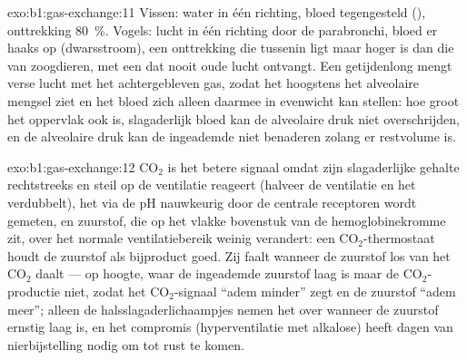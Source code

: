 \begin{solution}{exo:b1:gas-exchange:11}
Vissen: water in één richting, bloed tegengesteld (),
onttrekking \qty{80}{\%}. Vogels: lucht in één richting door de
parabronchi, bloed er haaks op (dwarsstroom), een onttrekking die
tussenin ligt maar hoger is dan die van zoogdieren, met een
 dat nooit oude lucht ontvangt. Een getijdenlong
mengt verse lucht met het achtergebleven gas, zodat het
 hoogstens het alveolaire mengsel ziet en het bloed
zich alleen daarmee in evenwicht kan stellen: hoe groot het oppervlak ook
is, slagaderlijk bloed kan de alveolaire druk niet overschrijden, en de
alveolaire druk kan de ingeademde niet benaderen zolang er restvolume is.
\end{solution}

\begin{solution}{exo:b1:gas-exchange:12}
$\mathrm{CO_2}$ is het betere signaal omdat zijn slagaderlijke gehalte
rechtstreeks en steil op de ventilatie reageert (halveer de ventilatie en
het verdubbelt), het via de pH nauwkeurig door de centrale receptoren wordt
gemeten, en zuurstof, die op het vlakke bovenstuk van de hemoglobinekromme
zit, over het normale ventilatiebereik weinig verandert: een
$\mathrm{CO_2}$-thermostaat houdt de zuurstof als bijproduct goed. Zij
faalt wanneer de zuurstof los van het $\mathrm{CO_2}$ daalt --- op hoogte,
waar de ingeademde zuurstof laag is maar de $\mathrm{CO_2}$-productie niet,
zodat het $\mathrm{CO_2}$-signaal ``adem minder'' zegt en de zuurstof
``adem meer''; alleen de halsslagaderlichaampjes nemen het over wanneer de
zuurstof ernstig laag is, en het compromis (hyperventilatie met alkalose)
heeft dagen van nierbijstelling nodig om tot rust te komen.
\end{solution}

